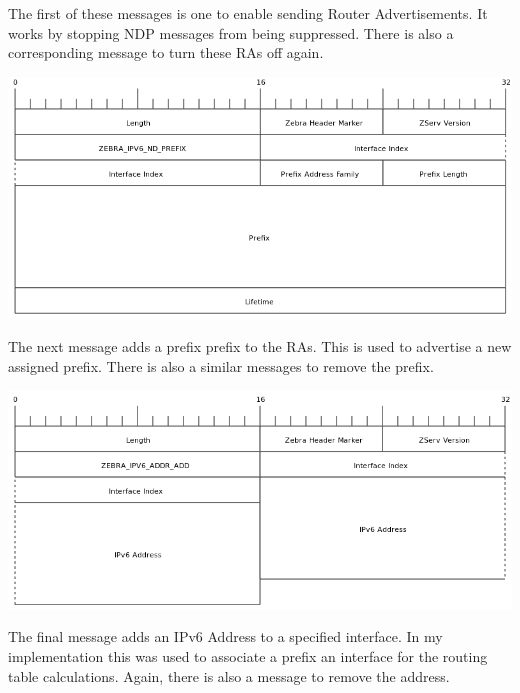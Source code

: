 The first of these messages is one to enable sending Router Advertisements. It
works by stopping NDP messages from being suppressed. There is also a
corresponding message to turn these RAs off again. 

\begin{center}
	\includegraphics[width=0.9\linewidth]{../Diagrams/Packets/ipv6_nd_prefix.png}
\end{center}

The next message adds a prefix prefix to the RAs. This is used to advertise a
new assigned prefix. There is also a similar messages to remove the prefix.


\begin{center}
	\includegraphics[width=0.9\linewidth]{../Diagrams/Packets/addr_add.png}
\end{center}

The final message adds an IPv6 Address to a specified interface. In my
implementation this was used to associate a prefix an interface for the routing
table calculations. Again, there is also a message to remove the address.

